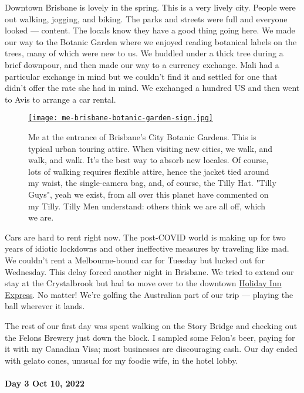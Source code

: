 Downtown Brisbane is lovely in the spring. This is a very lively city.
People were out walking, jogging, and biking. The parks and streets were
full and everyone looked --- content. The locals know they have a good
thing going here. We made our way to the Botanic Garden where we enjoyed
reading botanical labels on the trees, many of which were new to us. We
huddled under a thick tree during a brief downpour, and then made our
way to a currency exchange. Mali had a particular exchange in mind but
we couldn't find it and settled for one that didn't offer the rate she
had in mind. We exchanged a hundred US and then went to Avis to arrange
a car rental.

\captionsetup[figure]{labelformat=empty}
\begin{SCfigure}
\centering
 \href{https://conceptcontrol.smugmug.com/Trips/Overseas/Australia-New-Zealand-2022/i-SpMnddW/A}{\texttt{[image: me-brisbane-botanic-garden-sign.jpg]}}
\caption[Me Brisbane's City Botanic Gardens]{Me at the entrance of Brisbane's City Botanic Gardens. This is
typical urban touring attire. When visiting new cities, we walk, and
walk, and walk. It's the best way to absorb new locales. Of course, lots
of walking requires flexible attire, hence the jacket tied around my
waist, the single-camera bag, and, of course, the Tilly Hat. "Tilly
Guys", yeah we exist, from all over this planet have commented on my
Tilly. Tilly Men understand: others think we are all off, which we are.}
\label{fig:7548x1}
\end{SCfigure}


Cars are hard to rent right now. The post-COVID world is making up for
two years of idiotic lockdowns and other ineffective measures by
traveling like mad. We couldn't rent a Melbourne-bound car for Tuesday
but lucked out for Wednesday. This delay forced another night in
Brisbane. We tried to extend our stay at the Crystalbrook but had to
move over to the downtown
\href{https://www.ihg.com/holidayinnexpress/hotels/us/en/brisbane/bneex/hoteldetail}{Holiday
Inn Express}. No matter! We're golfing the Australian part of our trip
--- playing the ball wherever it lands.

The rest of our first day was spent walking on the Story Bridge and
checking out the Felons Brewery just down the block. I sampled some
Felon's beer, paying for it with my Canadian Visa; most businesses are
discouraging cash. Our day ended with gelato cones, unusual for my
foodie wife, in the hotel lobby.

\hypertarget{day-3-oct-10-2022}{%
\paragraph{\texorpdfstring{\textbf{Day 3 Oct 10,
2022}}{Day 3 Oct 10, 2022}}\label{day-3-oct-10-2022}}

